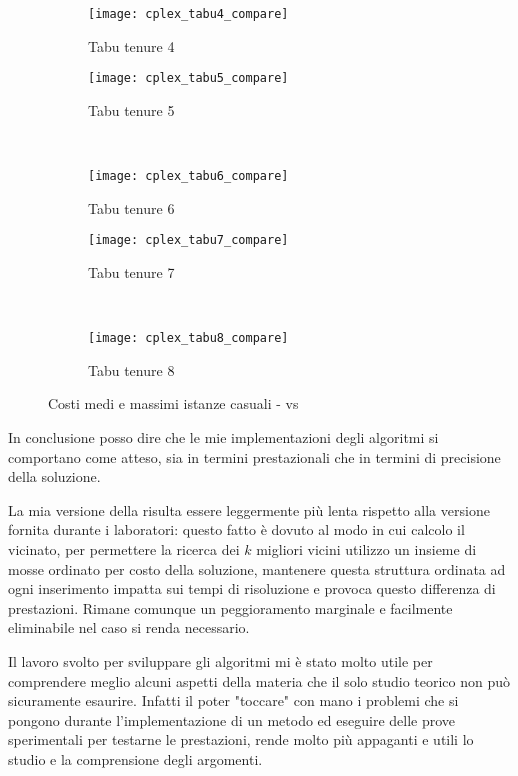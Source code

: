 \begin{figure}[htb]
	\centering
	\begin{subfigure}[b]{.45\textwidth}
			\texttt{[image: cplex\_tabu4\_compare]}
			\caption{Tabu tenure 4}
	\end{subfigure}
	\quad
	\begin{subfigure}[b]{.45\textwidth}
			\texttt{[image: cplex\_tabu5\_compare]}
			\caption{Tabu tenure 5}
	\end{subfigure}
	\\
	\begin{subfigure}[b]{.45\textwidth}
			\texttt{[image: cplex\_tabu6\_compare]}
			\caption{Tabu tenure 6}
	\end{subfigure}
	\quad
	\begin{subfigure}[b]{.45\textwidth}
			\texttt{[image: cplex\_tabu7\_compare]}
			\caption{Tabu tenure 7}
	\end{subfigure}
	\\
	\begin{subfigure}[b]{.45\textwidth}
			\texttt{[image: cplex\_tabu8\_compare]}
			\caption{Tabu tenure 8}
	\end{subfigure}
	\caption{Costi medi e massimi istanze casuali -  vs \tabu}
	\label{fig:costi cplex tabu}
\end{figure}

In conclusione posso dire che le mie implementazioni degli algoritmi si comportano come atteso, sia in termini prestazionali che in termini di precisione della soluzione.

La mia versione della \tabu risulta essere leggermente più lenta rispetto alla versione fornita durante i laboratori: questo fatto è dovuto al modo in cui calcolo il vicinato, per permettere la ricerca dei $k$ migliori vicini utilizzo un insieme di mosse ordinato per costo della soluzione, mantenere questa struttura ordinata ad ogni inserimento impatta sui tempi di risoluzione e provoca questo differenza di prestazioni.
Rimane comunque un peggioramento marginale e facilmente eliminabile nel caso si renda necessario.

Il lavoro svolto per sviluppare gli algoritmi mi è stato molto utile per comprendere meglio alcuni aspetti della materia che il solo studio teorico non può sicuramente esaurire. Infatti il poter "toccare" con mano i problemi che si pongono durante l'implementazione di un metodo ed eseguire delle prove sperimentali per testarne le prestazioni, rende molto più appaganti e utili lo studio e la comprensione degli argomenti.
